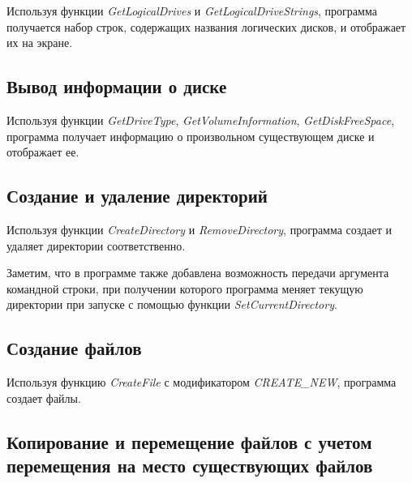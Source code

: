 \documentclass[a4paper,14pt]{extarticle}
\newcommand{\Code}[1]{\textit{#1}}
\begin{document}
Используя функции \Code{GetLogicalDrives} и \Code{GetLogicalDriveStrings},
программа получается набор строк, содержащих названия логических дисков, и
отображает их на экране.



\subsection{Вывод информации о диске}

Используя функции \Code{GetDriveType}, \Code{GetVolumeInformation},
\Code{GetDiskFreeSpace}, программа получает информацию о произвольном
существующем диске и отображает ее.



\subsection{Создание и удаление директорий}

Используя функции \Code{CreateDirectory} и \Code{RemoveDirectory}, программа
создает и удаляет директории соответственно.

Заметим, что в программе также добавлена возможность передачи аргумента
командной строки, при получении которого программа меняет текущую директории
при запуске с помощью функции \Code{SetCurrentDirectory}.



\subsection{Создание файлов}

Используя функцию \Code{CreateFile} с модификатором \Code{CREATE\_NEW},
программа создает файлы.



\subsection{Копирование и перемещение файлов с учетом перемещения на место
существующих файлов}
\end{document}

